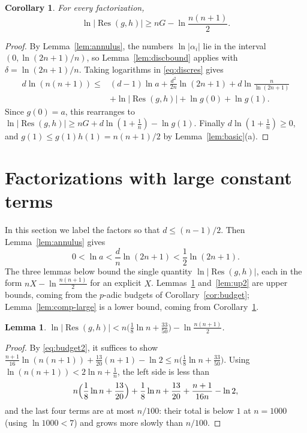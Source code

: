 \documentclass[11pt]{amsart}
\newtheorem{lemma}[theorem]{Lemma}
\newtheorem{corollary}[theorem]{Corollary}
\theoremstyle{definition}
\theoremstyle{remark}
\numberwithin{equation}{section}
\newcommand{\Res}{\operatorname{Res}}
\begin{document}
\begin{corollary}\label{cor:energy}
For every factorization,
\[
 \ln|\Res(g,h)|\ge nG-\ln\frac{n(n+1)}2 .
\]
\end{corollary}

\begin{proof}
By Lemma~\ref{lem:annulus}, the numbers $\ln|\alpha_i|$ lie in the interval
$(0,\ln(2n+1)/n)$, so Lemma~\ref{lem:discbound} applies with
$\delta=\ln(2n+1)/n$. Taking logarithms in \eqref{eq:discres} gives
\begin{align*}
 d\ln(n(n+1))\le{}&(d-1)\ln a+\frac{d^2}{2n}\ln(2n+1)+d\ln\frac n{\ln(2n+1)}\\
 &+\ln|\Res(g,h)|+\ln g(0)+\ln g(1).
\end{align*}
Since $g(0)=a$, this rearranges to
$\ln|\Res(g,h)|\ge nG+d\ln(1+\frac1n)-\ln g(1)$. Finally
$d\ln(1+\frac1n)\ge0$, and $g(1)\le g(1)h(1)=n(n+1)/2$ by
Lemma~\ref{lem:basic}(a).
\end{proof}

\section{Factorizations with large constant terms}\label{sec:large}

In this section we label the factors so that $d\le(n-1)/2$. Then
Lemma~\ref{lem:annulus} gives
\begin{equation}\label{eq:logarange}
 0<\ln a<\frac dn\ln(2n+1)<\frac12\ln(2n+1) .
\end{equation}
The three lemmas below bound the single quantity $\ln|\Res(g,h)|$, each in
the form $nX-\ln\frac{n(n+1)}2$ for an explicit $X$.
Lemmas~\ref{lem:up1} and~\ref{lem:up2} are upper bounds, coming from the
$p$-adic budgets of Corollary~\ref{cor:budget}; Lemma~\ref{lem:comp-large}
is a lower bound, coming from Corollary~\ref{cor:energy}.

\begin{lemma}\label{lem:up1}
$\ln|\Res(g,h)|<n\bigl(\frac18\ln n+\frac{33}{50}\bigr)-\ln\frac{n(n+1)}2$.
\end{lemma}

\begin{proof}
By \eqref{eq:budget2}, it suffices to show
$\frac{n+1}{16}\ln(n(n+1))+\frac{13}{20}(n+1)-\ln2\le
n\bigl(\frac18\ln n+\frac{33}{50}\bigr)$. Using
$\ln(n(n+1))<2\ln n+\frac1n$, the left side is less than
\[
 n\Bigl(\frac18\ln n+\frac{13}{20}\Bigr)
 +\frac18\ln n+\frac{13}{20}+\frac{n+1}{16n}-\ln2 ,
\]
and the last four terms are at most $n/100$: their total is below $1$ at
$n=1000$ (using $\ln1000<7$) and grows more slowly than $n/100$.
\end{proof}
\end{document}
